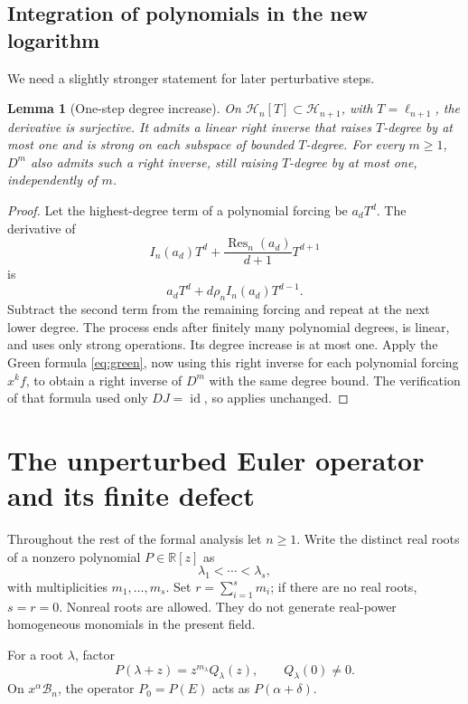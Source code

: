 \documentclass[11pt,a4paper]{article}
\numberwithin{equation}{section}
\newtheorem{lemma}[lemma]{Lemma}
\theoremstyle{definition}
\theoremstyle{remark}
\newcommand{\R}{\mathbb R}
\newcommand{\HH}{\mathcal H}
\newcommand{\Res}{\operatorname{Res}}
\newcommand{\id}{\operatorname{id}}
\begin{document}
\subsection{Integration of polynomials in the new logarithm}
We need a slightly stronger statement for later perturbative steps.

\begin{lemma}[One-step degree increase]
\label{lem:polynomial-extension}
On $\HH_n[T]\subset\HH_{n+1}$, with $T=\ell_{n+1}$, the derivative is surjective. It admits a linear right inverse that raises $T$-degree by at most one and is strong on each subspace of bounded $T$-degree. For every $m\ge1$, $D^m$ also admits such a right inverse, still raising $T$-degree by at most one, independently of $m$.
\end{lemma}
\begin{proof}
Let the highest-degree term of a polynomial forcing be $a_dT^d$. The derivative of
\[
 I_n(a_d)T^d+\frac{\Res_n(a_d)}{d+1}T^{d+1}
\]
is
\[
 a_dT^d+d\rho_nI_n(a_d)T^{d-1}.
\]
Subtract the second term from the remaining forcing and repeat at the next lower degree. The process ends after finitely many polynomial degrees, is linear, and uses only strong operations. Its degree increase is at most one. Apply the Green formula \eqref{eq:green}, now using this right inverse for each polynomial forcing $x^kf$, to obtain a right inverse of $D^m$ with the same degree bound. The verification of that formula used only $DJ=\id$, so applies unchanged.
\end{proof}

\section{The unperturbed Euler operator and its finite defect}
\label{sec:euler}
Throughout the rest of the formal analysis let $n\ge1$. Write the distinct real roots of a nonzero polynomial $P\in\R[z]$ as
\[
 \lambda_1<\cdots<\lambda_s,
\]
with multiplicities $m_1,\ldots,m_s$. Set $r=\sum_{i=1}^s m_i$; if there are no real roots, $s=r=0$. Nonreal roots are allowed. They do not generate real-power homogeneous monomials in the present field.

For a root $\lambda$, factor
\begin{equation}
 P(\lambda+z)=z^{m_\lambda}Q_\lambda(z),
 \qquad Q_\lambda(0)\ne0.
 \label{eq:root-factorization}
\end{equation}
On $x^\alpha\mathcal B_n$, the operator $P_0=P(E)$ acts as $P(\alpha+\delta)$.
\end{document}
